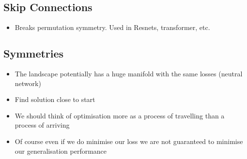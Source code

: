 
\begin{slide}
  \section[-2]{Skip Connections}

  \pb{}\pause{}
  \begin{center}
    \pause
  \end{center}
  \begin{itemize}
  \item Breaks permutation symmetry\pause. Used in Resnets,
    transformer, etc.\pause
  \end{itemize}
\end{slide}




\begin{slide}
\section[-2]{Symmetries}

\pb\pause
\begin{minipage}{0.6\linewidth}
  \begin{itemize}
\item The landscape potentially has a huge manifold with the same
  losses (neutral network)\pauseh
\item Find solution close to start\pauseh {}
\item We should think of optimisation more as a process of
  travelling than a process of arriving\pauseh
\item Of course even if we do minimise our loss we are not
  guaranteed to minimise our generalisation performance\pauseh
\end{itemize}\hfill
\end{minipage}
\begin{minipage}{0.35\linewidth}
  \begin{flushright}
    \pause
  \end{flushright}
\end{minipage}

\end{slide}

